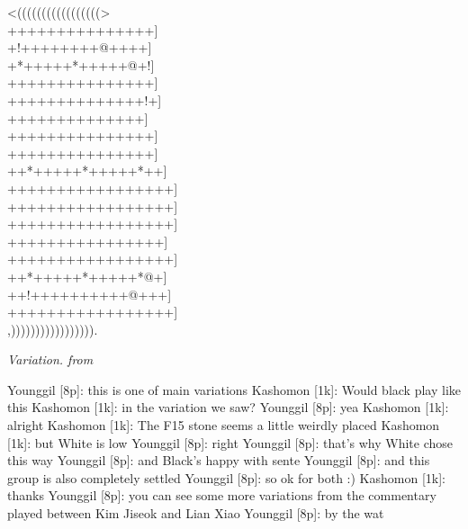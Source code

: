 \documentclass[letterpaper,12pt]{memoir}
\newcounter{GoVariation}[part]
\newcommand{\govariation}[1][]{%
 \stepcounter{GoVariation}
 \centerline{\textit{Variation.\thinspace\arabic{GoVariation}#1}}
}
\begin{document}
\begin{minipage}[t]{240pt}
{\gnos
<(((((((((((((((((>\\
+++++++++++++++]\\
+!++++++++@++++]\\
+*+++++*+++++@+!]\\
+++++++++++++++]\\
++++++++++++++!+]\\
++++++++++++++]\\
+++++++++++++++]\\
+++++++++++++++]\\
++*+++++*+++++*++]\\
+++++++++++++++++]\\
+++++++++++++++++]\\
+++++++++++++++++]\\
++++++++++++++++]\\
+++++++++++++++++]\\
++*+++++*+++++*@+]\\
++!++++++++++@+++]\\
+++++++++++++++++]\\
,))))))))))))))))).\\
}
\govariation[ from {\raisebox{-.17em}{\textnormal{\gnosOverlap{!}{\small{8}}}}}]
\end{minipage}
\begin{minipage}[t]{268.19999999999993pt}
\setlength{\parskip}{0.5em}
Younggil [8p]: this is one of main variations
Kashomon [1k]: Would black play like this
Kashomon [1k]: in the variation we saw?
Younggil [8p]: yea
Kashomon [1k]: alright
Kashomon [1k]: The F15 stone seems a little weirdly placed
Kashomon [1k]: but White is low
Younggil [8p]: right
Younggil [8p]: that's why White chose this way
Younggil [8p]: and Black's happy with sente
Younggil [8p]: and this group is also completely settled
Younggil [8p]: so ok for both :)
Kashomon [1k]: thanks
Younggil [8p]: you can see some more variations from the commentary played between Kim Jiseok and Lian Xiao
Younggil [8p]: by the wat


\end{minipage}
\vfill
\end{document}
